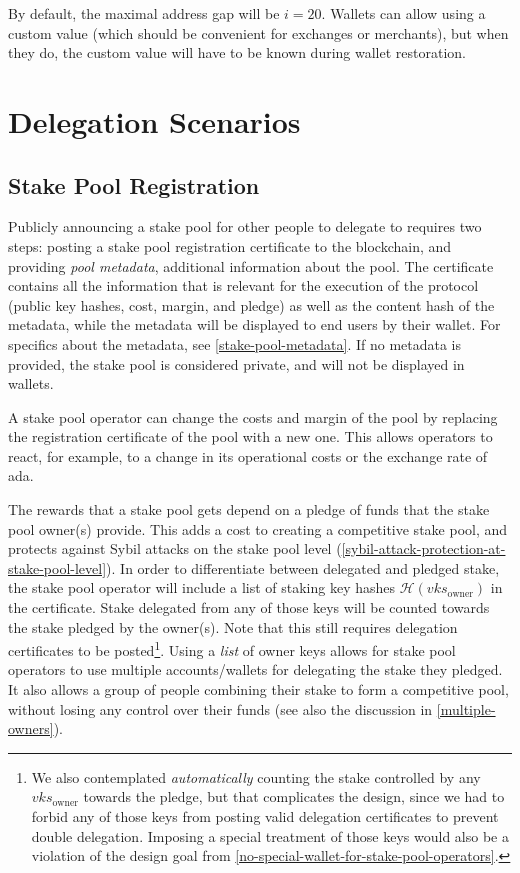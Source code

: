 \documentclass[11pt,a4paper]{article}
\begin{document}
By default, the maximal address gap will be \(i=20\). Wallets can
allow using a custom value (which should be convenient for exchanges
or merchants), but when they do, the custom value will have to be
known during wallet restoration.

\section{Delegation Scenarios}
\label{delegation-scenarios}

\subsection{Stake Pool Registration}
\label{stake-pool-registration}

Publicly announcing a stake pool for other people to delegate to requires two
steps: posting a stake pool registration certificate to the blockchain, and
providing \emph{pool metadata}, additional information about the pool. The
certificate contains all the information that is relevant for the execution of
the protocol (public key hashes, cost, margin, and pledge) as well as the
content hash of the metadata, while the metadata will be displayed to end users
by their wallet. For specifics about the metadata, see
\cref{stake-pool-metadata}. If no metadata is provided, the stake pool is
considered private, and will not be displayed in wallets.

A stake pool operator can change the costs and margin of the pool by
replacing the registration certificate of the pool with a new
one. This allows operators to react, for example, to a change in its
operational costs or the exchange rate of ada.

The rewards that a stake pool gets depend on a pledge of funds that
the stake pool owner(s) provide. This adds a cost to creating a
competitive stake pool, and protects against Sybil attacks on the
stake pool level
(\cref{sybil-attack-protection-at-stake-pool-level}). In order to
differentiate between delegated and pledged stake, the stake pool
operator will include a list of staking key hashes
\(\mathcal{H}(vks_\text{owner})\)
in the certificate. Stake delegated from any of those keys will be
counted towards the stake pledged by the owner(s). Note that this
still requires delegation certificates to be posted\footnote{We also
  contemplated \emph{automatically} counting the stake controlled by
  any \(vks_\text{owner}\)
  towards the pledge, but that complicates the design, since we had
  to forbid any of those keys from posting valid delegation
  certificates to prevent double delegation. Imposing a special
  treatment of those keys would also be a violation of the design goal
  from \cref{no-special-wallet-for-stake-pool-operators}.}.
Using a \emph{list} of owner keys allows for stake pool operators
to use multiple accounts/wallets for delegating the stake they
pledged. It also allows a group of people combining their stake to
form a competitive pool, without losing any control over their funds
(see also the discussion in \cref{multiple-owners}).
\end{document}
